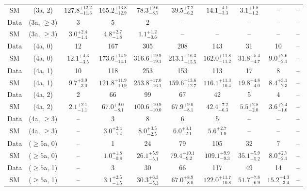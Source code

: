 \begin{table}[h!]
{\begin{tabular}{cccccccccc}
	SM & (3a, 2) & $127.8^{+ 12.2 }_{- 11.3 }$ & $165.2^{+ 13.8 }_{- 12.9 }$ & $78.3^{+ 9.6 }_{- 8.7 }$ & $39.5^{+ 7.2 }_{- 6.2 }$ & $14.1^{+ 4.1 }_{- 3.3 }$ & $3.1^{+ 1.8 }_{- 1.2 }$ & -- & -- \\[0.5ex] 
	Data & (3a, $\ge3$) & 3 & 5 & 2 & -- & -- & -- & -- & -- \\[0.5ex] 
	SM & (3a, $\ge3$) & $3.0^{+ 2.4 }_{- 1.4 }$ & $4.8^{+ 2.7 }_{- 1.8 }$ & $1.1^{+ 1.2 }_{- 0.6 }$ & -- & -- & -- & -- & -- \\[0.5ex] 
	Data & (4a, 0) & 12 & 167 & 305 & 208 & 143 & 31 & 10 & -- \\[0.5ex] 
	SM & (4a, 0) & $12.1^{+ 4.3 }_{- 3.5 }$ & $173.6^{+ 14.9 }_{- 14.1 }$ & $316.6^{+ 19.9 }_{- 19.1 }$ & $213.1^{+ 16.3 }_{- 15.5 }$ & $162.0^{+ 11.8 }_{- 11.2 }$ & $31.8^{+ 5.4 }_{- 4.7 }$ & $9.0^{+ 2.6 }_{- 2.1 }$ & -- \\[0.5ex] 
	Data & (4a, 1) & 10 & 118 & 253 & 153 & 113 & 17 & 8 & -- \\[0.5ex] 
	SM & (4a, 1) & $9.7^{+ 3.9 }_{- 3.0 }$ & $121.8^{+ 11.9 }_{- 10.9 }$ & $253.8^{+ 17.0 }_{- 16.1 }$ & $159.6^{+ 13.6 }_{- 12.7 }$ & $116.1^{+ 11.3 }_{- 10.4 }$ & $19.8^{+ 4.8 }_{- 4.0 }$ & $8.4^{+ 3.1 }_{- 2.3 }$ & -- \\[0.5ex] 
	Data & (4a, 2) & 2 & 66 & 99 & 67 & 42 & 5 & 4 & -- \\[0.5ex] 
	SM & (4a, 2) & $2.1^{+ 2.1 }_{- 1.1 }$ & $67.0^{+ 9.0 }_{- 8.1 }$ & $100.6^{+ 10.9 }_{- 10.0 }$ & $67.9^{+ 9.0 }_{- 8.1 }$ & $42.4^{+ 7.2 }_{- 6.3 }$ & $5.5^{+ 2.8 }_{- 2.0 }$ & $3.6^{+ 2.4 }_{- 1.6 }$ & -- \\[0.5ex] 
	Data & (4a, $\ge3$) & -- & 3 & 8 & 6 & 5 & -- & -- & -- \\[0.5ex] 
	SM & (4a, $\ge3$) & -- & $3.0^{+ 2.4 }_{- 1.4 }$ & $8.0^{+ 3.5 }_{- 2.5 }$ & $6.0^{+ 3.1 }_{- 2.1 }$ & $5.6^{+ 2.7 }_{- 1.9 }$ & -- & -- & -- \\[0.5ex] 
	Data & ($\ge5$a, 0) & -- & 1 & 24 & 79 & 105 & 32 & 7 & -- \\[0.5ex] 
	SM & ($\ge5$a, 0) & -- & $1.0^{+ 1.8 }_{- 0.8 }$ & $26.1^{+ 5.9 }_{- 5.1 }$ & $79.4^{+ 10.1 }_{- 9.2 }$ & $109.1^{+ 9.9 }_{- 9.3 }$ & $35.1^{+ 5.9 }_{- 5.2 }$ & $8.0^{+ 2.7 }_{- 2.1 }$ & -- \\[0.5ex] 
	Data & ($\ge5$a, 1) & -- & 3 & 30 & 66 & 117 & 49 & 14 & -- \\[0.5ex] 
	SM & ($\ge5$a, 1) & -- & $3.1^{+ 2.5 }_{- 1.5 }$ & $30.3^{+ 6.3 }_{- 5.3 }$ & $67.0^{+ 8.9 }_{- 8.0 }$ & $122.0^{+ 11.7 }_{- 10.8 }$ & $51.7^{+ 7.8 }_{- 6.9 }$ & $15.2^{+ 4.3 }_{- 3.4 }$ & -- \\[0.5ex] 

\end{tabular}}
\end{table}
